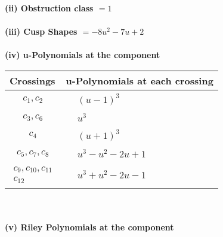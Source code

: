 \documentclass[1p]{elsarticle_modified}
\theoremstyle{definition}
\begin{document}
\flushleft \textbf{(ii) Obstruction class $= 1$}\\~\\
\flushleft \textbf{(iii) Cusp Shapes $= -8 u^2-7 u+2$}\\~\\
\newpage\renewcommand{\arraystretch}{1}
\flushleft \textbf{(iv) u-Polynomials at the component}\newline \\
\begin{tabular}{m{50pt}|m{274pt}}
Crossings & \hspace{64pt}u-Polynomials at each crossing \\
\hline $$\begin{aligned}c_{1},c_{2}\end{aligned}$$&$\begin{aligned}
&(u-1)^3
\end{aligned}$\\
\hline $$\begin{aligned}c_{3},c_{6}\end{aligned}$$&$\begin{aligned}
&u^3
\end{aligned}$\\
\hline $$\begin{aligned}c_{4}\end{aligned}$$&$\begin{aligned}
&(u+1)^3
\end{aligned}$\\
\hline $$\begin{aligned}c_{5},c_{7},c_{8}\end{aligned}$$&$\begin{aligned}
&u^3- u^2-2 u+1
\end{aligned}$\\
\hline $$\begin{aligned}c_{9},c_{10},c_{11}\\c_{12}\end{aligned}$$&$\begin{aligned}
&u^3+u^2-2 u-1
\end{aligned}$\\
\hline
\end{tabular}\\~\\
\newpage\renewcommand{\arraystretch}{1}
\flushleft \textbf{(v) Riley Polynomials at the component}\newline \\
\end{document}

